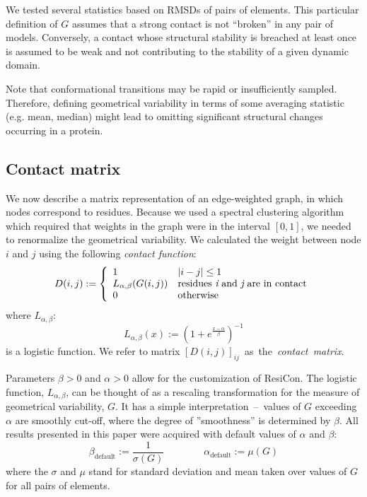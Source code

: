 \documentclass[a4paper,11pt,twoside]{book}%
\begin{document}
We tested several statistics based on RMSDs of pairs of elements.
This particular definition of $G$ assumes that a strong contact is not ``broken'' in any pair of models.
Conversely, a contact whose structural stability is breached at least once is assumed to be weak and not contributing to the stability of a given dynamic domain.

Note that conformational transitions may be rapid or insufficiently sampled.
Therefore, defining geometrical variability in terms of some averaging statistic (e.g. mean, median) might lead to omitting significant structural changes occurring in a protein.

\subsection*{Contact matrix}
We now describe a matrix representation of an edge-weighted graph, in which nodes correspond to residues.
Because we used a spectral clustering algorithm which required that weights in the graph were in the interval $[0,1]$, we needed to renormalize the geometrical variability.
We calculated the weight between node $i$ and $j$ using the following \emph{contact function}:
\begin{displaymath}
D(i,j) := \left\{ \begin{array}{ll}
1&  |i-j| \leq 1 \\
L_{\alpha,\beta}(G(i,j))& \text{residues {\it i} and {\it j} are in contact} \\
0& \textrm{otherwise}
\end{array} \right .
\end{displaymath}
where $L_{\alpha,\beta}$:
$$
L_{\alpha,\beta}(x):= \left ( 1 + e^{\frac{x-\alpha}{\beta} } \right )^{-1}
$$
is a logistic function.
We refer to matrix $[D(i,j)]_{ij}$~as~the~\emph{contact~matrix}.

Parameters $\beta>0$ and $\alpha>0$ allow for the customization of ResiCon.
The logistic function, $L_{\alpha,\beta}$, can be thought of as a rescaling transformation for the measure of geometrical variability, $G$.
It has a simple interpretation~--~values of $G$ exceeding $\alpha$ are smoothly cut-off, where the degree of ''smoothness'' is determined by $\beta$.
All results presented in this paper were acquired with default values of $\alpha$ and $\beta$:
\begin{equation}
\beta_{\text{default}} := \frac{1}{\sigma(G)} \qquad\qquad  \alpha_{\text{default}} := \mu(G)
\label{default}
\end{equation}
where the $\sigma$ and $\mu$ stand for standard deviation and mean taken over values of $G$ for all pairs of elements.
\end{document}
